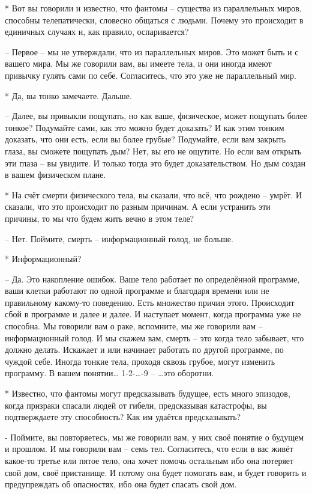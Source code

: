  * Вот вы говорили и известно, что фантомы – существа из параллельных миров, способны телепатически, словесно общаться с людьми. Почему это происходит в единичных случаях и, как правило, оспаривается?

 – Первое – мы не утверждали, что из параллельных миров. Это может быть и с вашего мира. Мы же говорили вам, вы имеете тела, и они иногда имеют привычку гулять сами по себе. Согласитесь, что это уже не параллельный мир.

 * Да, вы тонко замечаете. Дальше.

 – Далее, вы привыкли пощупать, но как ваше, физическое, может пощупать более тонкое? Подумайте сами, как это можно будет доказать? И как этим тонким доказать, что они есть, если вы более грубые? Подумайте, если вам закрыть глаза, вы сможете пощупать дым? Нет, вы его не ощутите. Но если вам открыть эти глаза – вы увидите. И только тогда это будет доказательством. Но дым создан в вашем физическом плане.

 * На счёт смерти физического тела, вы сказали, что всё, что рождено – умрёт. И сказали, что это происходит по разным причинам. А если устранить эти причины, то мы что будем жить вечно в этом теле?

 – Нет. Поймите, смерть – информационный голод, не больше.

 * Информационный?

 – Да. Это накопление ошибок. Ваше тело работает по определённой программе, ваши клетки работают по одной программе и благодаря времени или не правильному какому-то поведению. Есть множество причин этого. Происходит сбой в программе и далее и далее. И наступает момент, когда программа уже не способна. Мы говорили вам о раке, вспомните, мы же говорили вам – информационный голод. И мы скажем вам, смерть – это когда тело забывает, что должно делать. Искажает и или начинает работать по другой программе, по чуждой себе. Иногда тонкие тела, проходя сквозь грубое, могут изменить программу. В вашем понятии…
 1-2-…-9
 – …это оборотни.

 * Известно, что фантомы могут предсказывать будущее, есть много эпизодов, когда призраки спасали людей от гибели, предсказывая катастрофы, вы подтверждаете эту способность? Как им удаётся предсказывать?

 - Поймите, вы повторяетесь, мы же говорили вам, у них своё понятие о будущем и прошлом. И мы говорили вам – семь тел. Согласитесь, что если в вас живёт какое-то третье или пятое тело, она хочет помочь остальным ибо она потеряет свой дом, своё пристанище. И потому она будет помогать вам, и будет говорить и предупреждать об опасностях, ибо она будет спасать свой дом.

